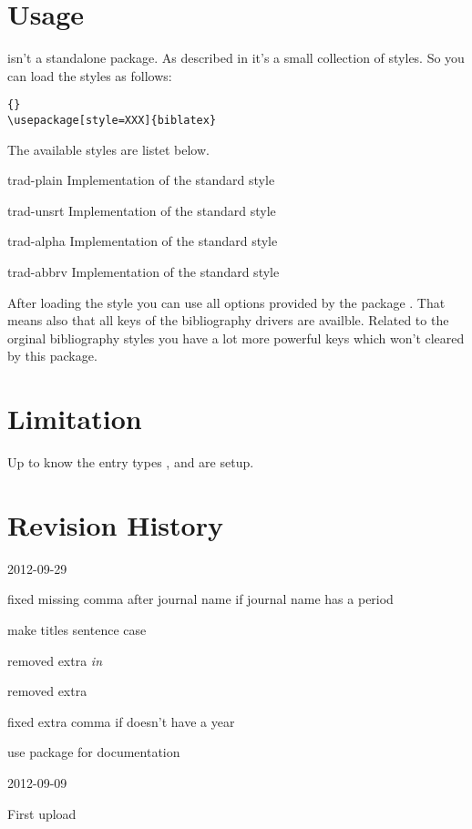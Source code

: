 \documentclass{ltxdockit}[2011/03/25]
\begin{document}
\section{Usage}

 isn't a standalone package. As described in  it's
a small collection of styles. So you can load the styles as follows:

\begin{lstlisting}[style=latex]{}
\usepackage[style=XXX]{biblatex}
\end{lstlisting}
The available styles are listet below.
\begin{marglist}

\item[trad-plain] Implementation of the standard style 
\item[trad-unsrt] Implementation of the standard style 
\item[trad-alpha] \BiberOnlyMark  Implementation of the standard style 
\item[trad-abbrv]  Implementation of the standard style 

\end{marglist}

After loading the style you can use all options provided by the package . That means also that all keys of the bibliography drivers are availble. Related to the orginal bibliography styles you have a lot more powerful keys which won't cleared by this package.

\section{Limitation}

Up to know the entry types ,  and  are
setup.

\section{Revision History}
\label{apx:log}


\begin{changelog}

\begin{release}{0.2}{2012-09-29}
\item fixed missing comma after journal name if journal name has a period
\item make titles sentence case
\item removed extra \emph{in}
\item removed extra 
\item fixed extra comma if  doesn't have a year
\item use package  for documentation
\end{release}

\begin{release}{0.1}{2012-09-09}
\item First upload
\end{release}

\end{changelog}
\end{document}

